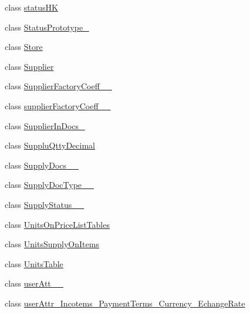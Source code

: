 \begin{DoxyCompactItemize}
\item 
class \mbox{\hyperlink{class_h_k_supply_1_1_migrations_1_1status_h_k}{status\+HK}}
\item 
class \mbox{\hyperlink{class_h_k_supply_1_1_migrations_1_1_status_prototype__01}{Status\+Prototype\+\_}}
\item 
class \mbox{\hyperlink{class_h_k_supply_1_1_migrations_1_1_store}{Store}}
\item 
class \mbox{\hyperlink{class_h_k_supply_1_1_migrations_1_1_supplier}{Supplier}}
\item 
class \mbox{\hyperlink{class_h_k_supply_1_1_migrations_1_1_supplier_factory_coeff__20170719__01}{Supplier\+Factory\+Coeff\+\_\+\_}}
\item 
class \mbox{\hyperlink{class_h_k_supply_1_1_migrations_1_1supplier_factory_coeff__20170720__01}{supplier\+Factory\+Coeff\+\_\+\_}}
\item 
class \mbox{\hyperlink{class_h_k_supply_1_1_migrations_1_1_supplier_in_docs__01}{Supplier\+In\+Docs\+\_}}
\item 
class \mbox{\hyperlink{class_h_k_supply_1_1_migrations_1_1_supplu_qtty_decimal}{Supplu\+Qtty\+Decimal}}
\item 
class \mbox{\hyperlink{class_h_k_supply_1_1_migrations_1_1_supply_docs__20170725__01}{Supply\+Docs\+\_\+\_}}
\item 
class \mbox{\hyperlink{class_h_k_supply_1_1_migrations_1_1_supply_doc_type__20170725__01}{Supply\+Doc\+Type\+\_\+\_}}
\item 
class \mbox{\hyperlink{class_h_k_supply_1_1_migrations_1_1_supply_status__20170724__01}{Supply\+Status\+\_\+\_}}
\item 
class \mbox{\hyperlink{class_h_k_supply_1_1_migrations_1_1_units_on_price_list_tables}{Units\+On\+Price\+List\+Tables}}
\item 
class \mbox{\hyperlink{class_h_k_supply_1_1_migrations_1_1_units_supply_on_items}{Units\+Supply\+On\+Items}}
\item 
class \mbox{\hyperlink{class_h_k_supply_1_1_migrations_1_1_units_table}{Units\+Table}}
\item 
class \mbox{\hyperlink{class_h_k_supply_1_1_migrations_1_1user_att__20170413__1}{user\+Att\+\_\+\_}}
\item 
class \mbox{\hyperlink{class_h_k_supply_1_1_migrations_1_1user_attr___incotems___payment_terms___currency___echange_rate}{user\+Attr\+\_\+\+Incotems\+\_\+\+Payment\+Terms\+\_\+\+Currency\+\_\+\+Echange\+Rate}}
\end{DoxyCompactItemize}
